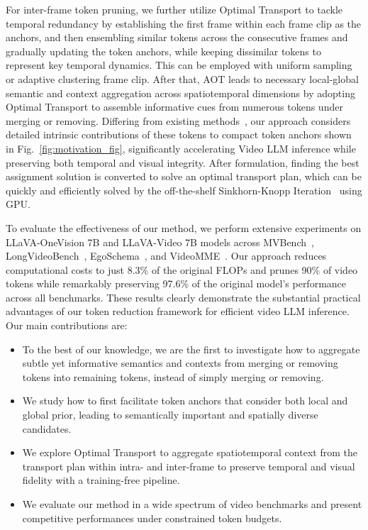 For inter-frame token pruning, we further utilize Optimal Transport to tackle temporal redundancy by establishing the first frame within each frame clip as the anchors, and then ensembling similar tokens across the consecutive frames and gradually updating the token anchors, while keeping dissimilar tokens to represent key temporal dynamics. This can be employed with uniform sampling or adaptive clustering frame clip.
After that, AOT leads to necessary local-global semantic and context aggregation across spatiotemporal dimensions by adopting Optimal Transport to assemble informative cues from numerous tokens under merging or removing. Differing from existing methods~\cite{tao2025dycoke,huang2024prunevid,liu2025hybrid,shen2024longvu}, our approach considers detailed intrinsic contributions of these tokens to compact token anchors shown in Fig.~\ref{fig:motivation_fig}, significantly accelerating Video LLM inference while preserving both temporal and visual integrity. After formulation, finding the best assignment solution is converted to solve an optimal transport plan, which can be quickly and efficiently solved by the off-the-shelf Sinkhorn-Knopp Iteration~\cite{cuturi2013sinkhorn} using GPU.



To evaluate the effectiveness of our method, we perform extensive experiments on  LLaVA-OneVision 7B and LLaVA-Video 7B models across MVBench~\cite{li2024mvbench}, LongVideoBench~\cite{wu2024longvideobench}, EgoSchema~\cite{mangalam2023egoschema}, and VideoMME~\cite{fu2025video}. Our approach reduces computational costs to just 8.3\% of the original FLOPs and prunes 90\% of video tokens while remarkably preserving 97.6\% of the original model’s performance across all benchmarks. These results clearly demonstrate the substantial practical advantages of our token reduction framework for efficient video LLM inference.
Our main contributions are:

\begin{itemize}
    \item To the best of our knowledge, we are the first to investigate how to aggregate subtle yet informative semantics and contexts from merging or removing tokens into remaining tokens, instead of simply merging or removing.
    
    \item We study how to first facilitate token anchors that consider both local and global prior, leading to semantically important and spatially diverse candidates.
    
    \item We explore Optimal Transport to aggregate spatiotemporal context from the transport plan within intra- and inter-frame to preserve temporal and visual fidelity with a training-free pipeline.

    \item We evaluate our method in a wide spectrum of video benchmarks and present competitive performances under constrained token budgets.
\end{itemize}

